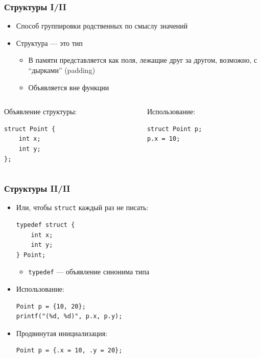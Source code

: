 \documentclass[aspectratio=169]{beamer}
\begin{document}
\begin{frame}[fragile]
    \frametitle{Структуры I/II}
    \begin{itemize}
        \item Способ группировки родственных по смыслу значений
        \item Структура --- это тип
              \begin{itemize}
                  \item В памяти представляется как поля, лежащие друг за другом, возможно, с \enquote{дырками} (padding)
                  \item Объявляется вне функции
              \end{itemize}
    \end{itemize}
    \begin{columns}[t]
        \begin{column}{0.45\linewidth}
            Объявление структуры:
            \begin{verbatim}
struct Point {
    int x;
    int y;
};
            \end{verbatim}
        \end{column}
        \begin{column}{0.45\linewidth}
            Использование:
            \begin{verbatim}
struct Point p;
p.x = 10;
            \end{verbatim}
        \end{column}
    \end{columns}
\end{frame}

\begin{frame}[fragile]
    \frametitle{Структуры II/II}
    \begin{itemize}
        \item Или, чтобы \texttt{struct} каждый раз не писать:
              \begin{verbatim}
typedef struct {
    int x;
    int y;
} Point;
            \end{verbatim}
              \begin{itemize}
                  \item \texttt{typedef} --- объявление синонима типа
              \end{itemize}
        \item Использование:
              \begin{verbatim}
Point p = {10, 20};
printf("(%d, %d)", p.x, p.y);
            \end{verbatim}
        \item Продвинутая инициализация:
              \begin{verbatim}
Point p = {.x = 10, .y = 20};
            \end{verbatim}
    \end{itemize}
\end{frame}
\end{document}
